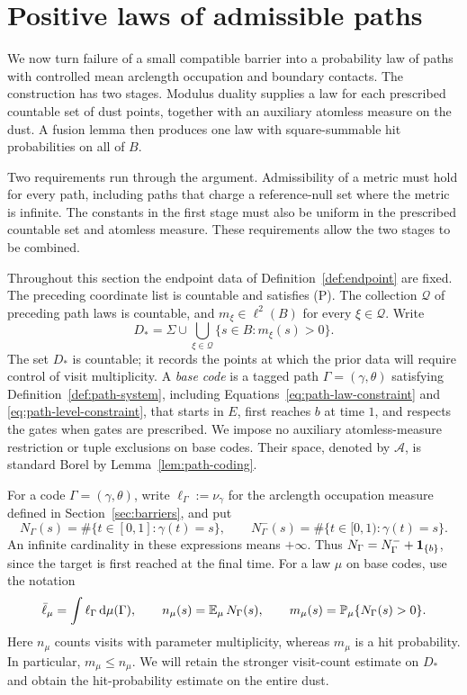 \section{Positive laws of admissible paths}\label{sec:laws}

We now turn failure of a small compatible barrier into a probability law
of paths with controlled mean arclength occupation and boundary contacts.
The construction has two stages.  Modulus duality supplies a law for each
prescribed countable set of dust points, together with an auxiliary
atomless measure on the dust.  A fusion lemma then produces one law with
square-summable hit probabilities on all of $B$.

Two requirements run through the argument.  Admissibility of a metric
must hold for every path, including paths that charge a reference-null set
where the metric is infinite.  The constants in the first stage must also
be uniform in the prescribed countable set and atomless measure.  These
requirements allow the two stages to be combined.

Throughout this section the endpoint data of
Definition~\ref{def:endpoint} are fixed.  The preceding coordinate list is
countable and satisfies \textup{(P)}.  The collection \(\mathscr Q\) of
preceding path laws is countable, and \(m_\xi\in\ell^2(B)\) for every
\(\xi\in\mathscr Q\).  Write
\[
 D_* = \Sigma\cup\bigcup_{\xi\in\mathscr Q}\{s\in B:m_\xi(s)>0\}.
\]
The set $D_*$ is countable; it records the points at which the prior data
will require control of visit multiplicity.  A \emph{base code} is a tagged path
\(\Gamma=(\gamma,\theta)\) satisfying
Definition~\ref{def:path-system}, including
Equations~\eqref{eq:path-law-constraint} and
\eqref{eq:path-level-constraint}, that starts in \(E\), first reaches \(b\)
at time \(1\), and respects the gates when gates are prescribed.  We impose no
auxiliary atomless-measure restriction or tuple exclusions on base codes.
Their space, denoted by
\(\mathscr A\), is standard Borel by Lemma~\ref{lem:path-coding}.

For a code \(\Gamma=(\gamma,\theta)\), write
\(\ell_\Gamma:=\nu_\gamma\) for the arclength occupation measure defined in
Section~\ref{sec:barriers}, and put
\[
 N_\Gamma(s)=\#\{t\in[0,1]:\gamma(t)=s\},\qquad
 N^-_\Gamma(s)=\#\{t\in[0,1):\gamma(t)=s\}.
\]
An infinite cardinality in these expressions means \(+\infty\).
Thus
\(N_\Gamma=N^-_\Gamma+\mathbf 1_{\{b\}}\), since the target is first reached at
the final time.  For a law \(\mu\) on base codes, use the notation
\[
 \bar\ell_\mu=\int\ell_\Gamma\,\mathrm d\mu(\Gamma),\qquad
 n_\mu(s)=\operatorname{\mathbb E}_\mu N_\Gamma(s),\qquad
 m_\mu(s)=\operatorname{\mathbb P}_\mu\{N_\Gamma(s)>0\}.
\]
Here \(n_\mu\) counts visits with parameter multiplicity, whereas \(m_\mu\)
is a hit probability.  In particular, \(m_\mu\le n_\mu\).  We will retain
the stronger visit-count estimate on $D_*$ and obtain the hit-probability
estimate on the entire dust.

